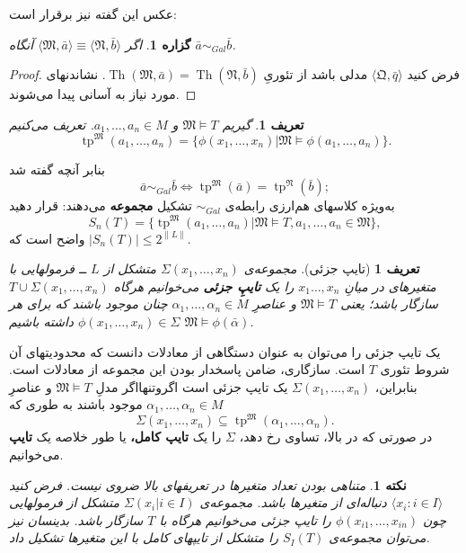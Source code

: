 \documentclass[12pt,a4paper]{report}
\theoremstyle{colorhead}
\newtheorem{prop}[thm]{گزاره}
\newtheorem{defn}[thm]{تعریف}
\newtheorem{nokte}[thm]{نکته}
\DeclareMathOperator{\Th}{Th}
\DeclareMathOperator{\tp}{tp}
\begin{document}
عکس این گفته نیز برقرار است:
\begin{prop}
اگر
$\langle \mathfrak{M},\bar{a}\rangle\equiv\langle \mathfrak{N},\bar{b}\rangle$
آنگاه
$\bar{a}\sim_{Gal}\bar{b}$.
\end{prop}
\begin{proof}
فرض کنید
$\langle \mathfrak{Q},\bar{q}\rangle$
مدلی باشد از تئوریِ
$\Th(\mathfrak{M},\bar{a})=\Th(\mathfrak{N},\bar{b})$.
نشاندنهای مورد نیاز به آسانی پیدا می‌شوند.
\end{proof}
\begin{defn}
گیریم 
$\mathfrak{M}\models T$
و
$a_1,\ldots,a_n\in M$.
تعریف می‌کنیم
\[
\tp^\mathfrak{M}(a_1,\ldots,a_n)=\{\phi(x_1,\ldots,x_n)|\mathfrak{M}\models
\phi(a_1,\ldots,a_n)\}.
\]
\end{defn}
بنابر آنچه گفته شد
\[
\bar{a}\sim_{Gal}\bar{b}\Leftrightarrow \tp^\mathfrak{M}(\bar{a})
=\tp^\mathfrak{N}(\bar{b});
\]
به‌ويژه کلاسهای هم‌ارزی رابطه‌ی 
$\sim_{Gal}$
تشکیل
\textbf{ مجموعه}
 می‌دهند: قرار دهید
 \[
 S_n(T)=\{\tp^\mathfrak{M}(a_1,\ldots,a_n)|
 \mathfrak{M}\models T, a_1,\ldots, a_n\in \mathfrak{M}\},
 \]
 واضح است که
 $|S_n(T)|\leq 2^{\|L\|}$.
\begin{defn}[تایپ جزئی]
مجموعه‌ی
$\Sigma(x_1,\ldots,x_n)$
متشکل از
$L$
ــ 
فرمولهایی با متغیرهای در میانِ
$x_1\ldots,x_n$
را 
یک
\textbf{تایپِ جزئی}
می‌خوانیم هرگاه
$T\cup \Sigma(x_1,\ldots,x_n)$
سازگار باشد؛ یعنی
$\mathfrak{M}\models T$
و عناصرِ
$\alpha_1,\ldots,\alpha_n\in M$
چنان موجود باشند که برای هر
$\phi(x_1,\ldots,x_n)\in \Sigma$
داشته باشیم
$\mathfrak{M}\models \phi(\bar{\alpha})$.
\end{defn}
یک تایپ جزئی را می‌توان به عنوان دستگاهی از معادلات دانست که محدودیتهای آن شروط تئوری
$T$
است. سازگاری، ضامن پاسخدار بودن این مجموعه از معادلات است. بنابراین،
$\Sigma(x_1,\ldots,x_n)$
یک تایپ جزئی است اگروتنهااگر مدلِ
$\mathfrak{M}\models T$
و عناصرِ
$\alpha_1,\ldots,\alpha_n\in M$
موجود باشند به طوری که
\[
\Sigma(x_1,\ldots,x_n)\subseteq \tp^\mathfrak{M}(\alpha_1,\ldots,\alpha_n).
\]
در صورتی که در بالا، تساوی رخ دهد، 
$\Sigma$
را یک
\textbf{تایپ کامل،}
 یا طور خلاصه یک 
\textbf{ تایپ}
  می‌خوانیم.
\begin{nokte}
متناهی بودن تعداد متغیرها در تعریفهای بالا ضروی نیست. فرض کنید
$\langle x_i:i\in I\rangle$
دنباله‌ای از متغیرها باشد. مجموعه‌ی
$\Sigma(x_i|i\in I)$
متشکل از فرمولهایی چون
$\phi(x_{i1},\ldots,x_{in})$
را تایپ جزئی می‌خوانیم هرگاه با
$T$
سازگار باشد.
بدینسان
نیز می‌توان
مجموعه‌ی
$S_I(T)$
را
متشکل از تایپهای کامل با این متغیرها  تشکیل داد. 
\end{nokte}
\end{document}
